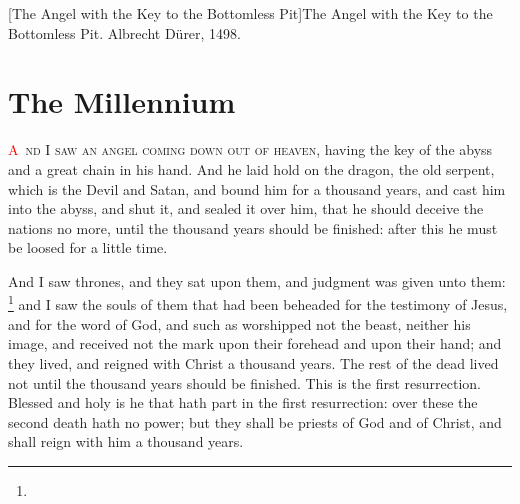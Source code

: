 [The Angel with the Key to the Bottomless Pit]{The Angel with the Key to the Bottomless Pit. Albrecht Dürer, 1498.}

\chapter{The Millennium}
\fancyhead{} %
\lettrine[lines=3,slope=0.5em]{\textcolor{red}{A}}{\ nd I saw an angel coming down out of heaven}, having the key of the abyss and a great chain in his hand. 
And he laid hold on the dragon, the old serpent, which is the Devil and Satan, and bound him for a thousand years, 
and cast him into the abyss, and shut it,%
and sealed it over him, that he should deceive the nations no more, until the thousand years should be finished: after this he must be loosed for a little time.

And I saw thrones, and they sat upon them, and judgment was given unto them:%
	\footnote{ %
			  } %
and I saw the souls of them that had been beheaded for the testimony of Jesus, and for the word of God, and such as worshipped not the beast, neither his image, and received not the mark upon their forehead and upon their hand; and they lived,%
and reigned with Christ a thousand years.%
The rest of the dead lived not until the thousand years should be finished. This is the first resurrection. 
Blessed and holy is he that hath part in the first resurrection: over these the second death hath no power; but they shall be priests of God and of Christ, and shall reign with him a thousand years.


